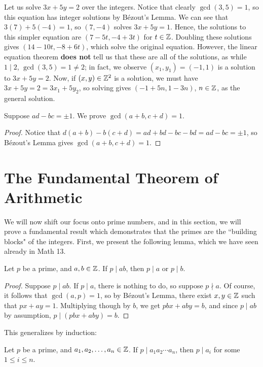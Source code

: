 \documentclass{article}
\begin{document}
\begin{example}
Let us solve $3x + 5y = 2$ over the integers. Notice that clearly $\gcd(3, 5) = 1$, so this equation has integer solutions by Bézout's Lemma. We can see that $3(7) + 5(-4) = 1$, so $(7, -4)$ solves $3x + 5y = 1$. Hence, the solutions to this simpler equation are $(7 - 5t, -4+3t)$ for $t\in \mathbb Z$. Doubling these solutions gives $(14 - 10t, -8+6t)$, which solve the original equation. However, the linear equation theorem \textbf{does not} tell us that these are all of the solutions, as while $1\mid 2$, $\gcd(3,5) = 1 \neq 2$; in fact, we observe $(x_1, y_1) = (-1, 1)$ is a solution to $3x + 5y = 2$. Now, if $(x,y)\in\mathbb Z^2$ is a solution, we must have $3x + 5y = 2 = 3x_1 + 5y_2$, so solving gives $\boxed{(-1 + 5n, 1-3n)}$, $n\in\mathbb Z$, as the general solution.
\end{example}

\newpage
\begin{example}
Suppose $ad-bc = \pm 1$. We prove $\gcd(a+b, c+d) = 1$.
\end{example}
\begin{proof}
Notice that $d(a+b) - b(c+d) = ad + bd - bc - bd = ad-bc = \pm 1$, so Bézout's Lemma gives $\gcd(a+b, c+d) = 1$.
\end{proof}

\setcounter{section}{33}
\section{The Fundamental Theorem of Arithmetic}
We will now shift our focus onto prime numbers, and in this section, we will prove a fundamental result which demonstrates that the primes are the ``building blocks" of the integers. First, we present the following lemma, which we have seen already in Math 13.
\begin{lemma}
Let $p$ be a prime, and $a,b\in \mathbb Z$. If $p\mid ab$, then $p\mid a$ or $p\mid b$.
\end{lemma}
\begin{proof}
Suppose $p\mid ab$. If $p\mid a$, there is nothing to do, so suppose $p\nmid a$. Of course, it follows that $\gcd(a, p) = 1$, so by Bézout's Lemma, there exist $x,y\in\mathbb Z$ such that $px + ay = 1$. Multiplying though by $b$, we get $pbx + aby = b$, and since $p\mid ab$ by assumption, $p\mid (pbx + aby) = b$.
\end{proof}

This generalizes by induction:
\begin{corollary}\label{34.2 in notes}
Let $p$ be a prime, and $a_1, a_2,\ldots, a_n\in\mathbb Z$. If $p\mid a_1a_2\cdots a_n$, then $p\mid a_i$ for some $1\leq i \leq n$.
\end{corollary}
\end{document}
